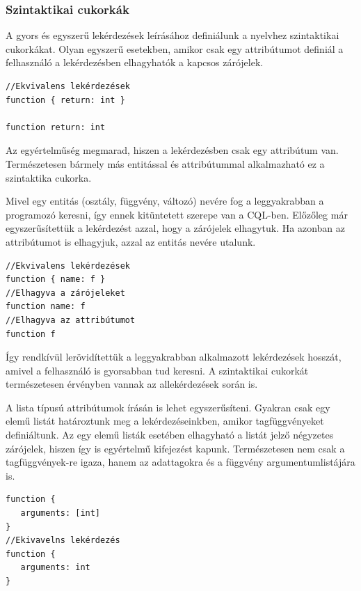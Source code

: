 \documentclass[a4paper,12pt]{report}
\begin{document}
\subsubsection{Szintaktikai cukorkák}
A gyors és egyszerű lekérdezések leírásához definiálunk a nyelvhez szintaktikai cukorkákat. Olyan egyszerű esetekben, amikor csak egy attribútumot definiál a felhasználó a lekérdezésben elhagyhatók a kapcsos zárójelek.
\begin{verbatim}
//Ekvivalens lekérdezések
function { return: int }

function return: int
\end{verbatim}
\par Az egyértelműség megmarad, hiszen a lekérdezésben csak egy attribútum van. Természetesen bármely más entitással és attribútummal alkalmazható ez a szintaktika cukorka. 
\par Mivel egy entitás (osztály, függvény, változó) nevére fog a leggyakrabban a programozó keresni, így ennek kitüntetett szerepe van a CQL-ben. Előzőleg már egyszerűsítettük a lekérdezést azzal, hogy a zárójelek elhagytuk. Ha azonban az attribútumot is elhagyjuk, azzal az entitás nevére utalunk.
\begin{verbatim}
//Ekvivalens lekérdezések
function { name: f }
//Elhagyva a zárójeleket
function name: f
//Elhagyva az attribútumot
function f
\end{verbatim}
\par Így rendkívül lerövidítettük a leggyakrabban alkalmazott lekérdezések hosszát, amivel a felhasználó is gyorsabban tud keresni. A szintaktikai cukorkát természetesen érvényben vannak az allekérdezések során is.
\par A lista típusú attribútumok írásán is lehet egyszerűsíteni. Gyakran csak egy elemű listát határoztunk meg a lekérdezéseinkben, amikor tagfüggvényeket definiáltunk. Az egy elemű listák esetében elhagyható a listát jelző négyzetes zárójelek, hiszen így is egyértelmű kifejezést kapunk. Természetesen nem csak a tagfüggvények-re igaza, hanem az adattagokra és a függvény argumentumlistájára is.
\begin{verbatim}
function {
   arguments: [int]
}
//Ekivavelns lekérdezés
function {
   arguments: int
}
\end{verbatim}
\end{document}
